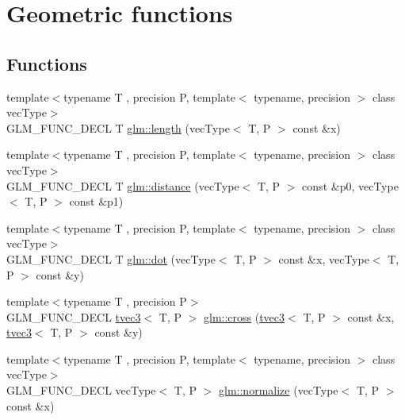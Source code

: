 \hypertarget{group__core__func__geometric}{}\section{Geometric functions}
\label{group__core__func__geometric}
\subsection*{Functions}
\begin{DoxyCompactItemize}
\item 
{\footnotesize template$<$typename T , precision P, template$<$ typename, precision $>$ class vec\+Type$>$ }\\G\+L\+M\+\_\+\+F\+U\+N\+C\+\_\+\+D\+E\+CL T \hyperlink{group__core__func__geometric_ga18d45e3d4c7705e67ccfabd99e521604}{glm\+::length} (vec\+Type$<$ T, P $>$ const \&x)
\item 
{\footnotesize template$<$typename T , precision P, template$<$ typename, precision $>$ class vec\+Type$>$ }\\G\+L\+M\+\_\+\+F\+U\+N\+C\+\_\+\+D\+E\+CL T \hyperlink{group__core__func__geometric_ga7ca317dde0d7e94d920153554d4a02a8}{glm\+::distance} (vec\+Type$<$ T, P $>$ const \&p0, vec\+Type$<$ T, P $>$ const \&p1)
\item 
{\footnotesize template$<$typename T , precision P, template$<$ typename, precision $>$ class vec\+Type$>$ }\\G\+L\+M\+\_\+\+F\+U\+N\+C\+\_\+\+D\+E\+CL T \hyperlink{group__core__func__geometric_ga7dada304da2ba7dd3376ab4f178c3f6b}{glm\+::dot} (vec\+Type$<$ T, P $>$ const \&x, vec\+Type$<$ T, P $>$ const \&y)
\item 
{\footnotesize template$<$typename T , precision P$>$ }\\G\+L\+M\+\_\+\+F\+U\+N\+C\+\_\+\+D\+E\+CL \hyperlink{structglm_1_1tvec3}{tvec3}$<$ T, P $>$ \hyperlink{group__core__func__geometric_gafe2cae8cb26fd44be62aee97369d0af8}{glm\+::cross} (\hyperlink{structglm_1_1tvec3}{tvec3}$<$ T, P $>$ const \&x, \hyperlink{structglm_1_1tvec3}{tvec3}$<$ T, P $>$ const \&y)
\item 
{\footnotesize template$<$typename T , precision P, template$<$ typename, precision $>$ class vec\+Type$>$ }\\G\+L\+M\+\_\+\+F\+U\+N\+C\+\_\+\+D\+E\+CL vec\+Type$<$ T, P $>$ \hyperlink{group__core__func__geometric_gada9451ec170a36fe53552812b9c03a68}{glm\+::normalize} (vec\+Type$<$ T, P $>$ const \&x)
\item 

\end{DoxyCompactItemize}
